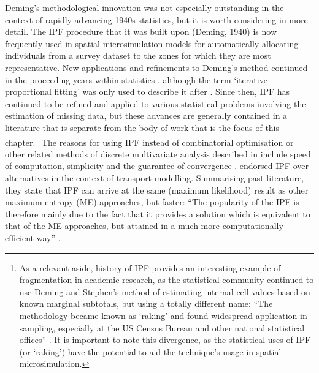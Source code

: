 Deming's methodological innovation was not especially outstanding in the context of
rapidly advancing 1940s statistics, but it is worth considering in more detail. The
IPF procedure that it was built upon (Deming, 1940) 
is now frequently used in spatial microsimulation models
 for automatically allocating individuals from a survey
dataset to the zones for which they are most representative.
New applications and refinements to Deming's method continued in the
proceeding years within statistics
\citep{stephan1942iterative,Friedlander1961-ipf}, although the term `iterative
proportional fitting' was only used to describe it after
\citet{Fienberg1970}. Since then, IPF has continued to be refined and applied to
various statistical problems involving the estimation of missing data, but
these advances are generally contained in a literature that is separate from
the body of work that is the focus of this
chapter.\footnote{As
a relevant
aside, history of IPF provides an interesting example of fragmentation in
academic research, as the statistical community continued to use Deming and
Stephen's method of estimating internal cell values based on known marginal
subtotals,
but using a totally different name: ``The methodology became known as `raking'
and found widespread application in sampling, especially at the US Census Bureau
and other national statistical offices''  \citet{Fienberg2007}. It is important
to note this divergence, as the statistical uses of IPF (or `raking') have the
potential to aid the technique's usage in spatial microsimulation.
}
The reasons for using IPF instead of combinatorial optimisation or other related
methods of discrete multivariate analysis described
in \citet{bishop2007discrete} include 
speed of computation, simplicity and
the guarantee of convergence \citep{Deming1940, Mosteller1968,
Fienberg1970, Wong1992, Pritchard2012}.
\citet{Rich2012} endorsed IPF over alternatives in the context of transport modelling.
Summarising past literature, they state that IPF can arrive at the same
(maximum likelihood) result as other maximum entropy (ME) approaches,
but faster: ``The popularity of the IPF is therefore mainly due to the
fact that it provides a solution which is equivalent to that of the ME approaches,
but attained in a much more computationally efficient way'' \citep{Rich2012}.

